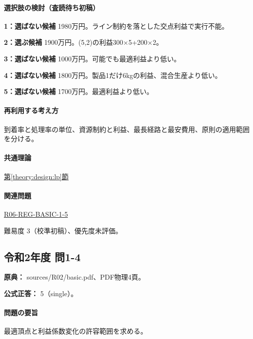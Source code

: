 \paragraph{選択肢の検討（査読待ち初稿）}\mbox{}\par

\noindent\textbf{1：選ばない候補} 1980万円。ライン制約を落とした交点利益で実行不能。\par

\noindent\textbf{2：選ぶ候補} 1900万円。(5,2)の利益300×5+200×2。\par

\noindent\textbf{3：選ばない候補} 1000万円。可能でも最適利益より低い。\par

\noindent\textbf{4：選ばない候補} 1800万円。製品1だけ6kgの利益、混合生産より低い。\par

\noindent\textbf{5：選ばない候補} 1700万円。最適利益より低い。\par

\paragraph{再利用する考え方} 到着率と処理率の単位、資源制約と利益、最長経路と最安費用、原則の適用範囲を分ける。

\paragraph{共通理論} \hyperref[theory:design:lp]{第\ref*{theory:design:lp}節}

\paragraph{関連問題} \hyperref[q:r06-reg-basic-1-5]{R06-REG-BASIC-1-5}

\par 難易度 3（校準初稿）、優先度未評価。

\subsection{令和2年度 問1-4}
\label{q:r02-reg-basic-1-4}

\noindent\textbf{原典：} sources/R02/basic.pdf、PDF物理4頁。

\textbf{公式正答：} 5（single）。

\paragraph{問題の要旨} 最適頂点と利益係数変化の許容範囲を求める。

